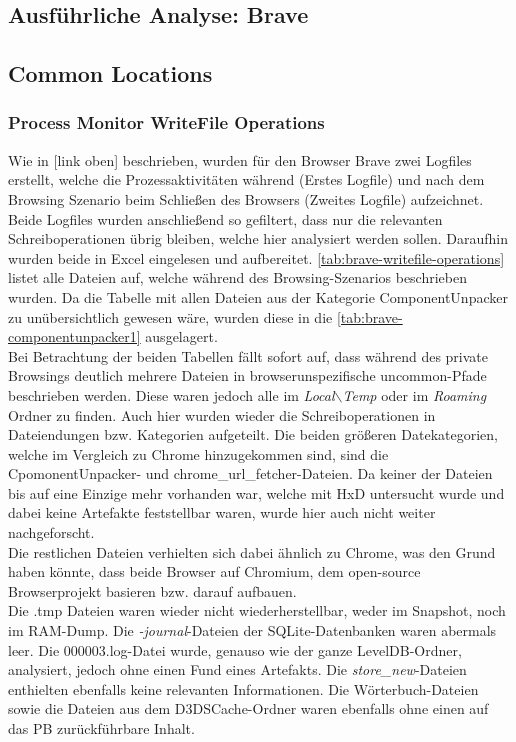 \begin{appendices}

\section{Ausführliche Analyse: Brave}
\subsection{Common Locations}
\label{subsection:appendix-brave-common-locations}
\subsubsection*{Process Monitor WriteFile Operations}
\label{subsubsection:appendix-brave-common-locations-writefile-operations}

Wie in [link oben] beschrieben, wurden für den Browser Brave zwei Logfiles erstellt, welche die Prozessaktivitäten während (Erstes Logfile) und nach dem Browsing Szenario beim Schließen des Browsers (Zweites Logfile) aufzeichnet. Beide Logfiles wurden anschließend so gefiltert, dass nur die relevanten Schreiboperationen übrig bleiben, welche hier analysiert werden sollen. Daraufhin wurden beide in Excel eingelesen und aufbereitet. \autoref{tab:brave-writefile-operations} listet alle Dateien auf, welche während des Browsing-Szenarios beschrieben wurden. Da die Tabelle mit allen Dateien aus der Kategorie \glqq{}ComponentUnpacker\grqq{} zu unübersichtlich gewesen wäre, wurden diese in die \autoref{tab:brave-componentunpacker1} ausgelagert.\\
Bei Betrachtung der beiden Tabellen fällt sofort auf, dass während des private Browsings deutlich mehrere Dateien in browserunspezifische \glqq{}uncommon\grqq{}-Pfade beschrieben werden. Diese waren jedoch alle im \textit{Local$\backslash$Temp} oder im \textit{Roaming} Ordner zu finden. Auch hier wurden wieder die Schreiboperationen in Dateiendungen bzw. Kategorien aufgeteilt. Die beiden größeren Datekategorien, welche im Vergleich zu Chrome hinzugekommen sind, sind die \glqq{}CpomonentUnpacker\grqq{}- und \glqq{}chrome\_url\_fetcher\grqq{}-Dateien. Da keiner der Dateien bis auf eine Einzige mehr vorhanden war, welche mit HxD untersucht wurde und dabei keine Artefakte feststellbar waren, wurde hier auch nicht weiter nachgeforscht. \\
Die restlichen Dateien verhielten sich dabei ähnlich zu Chrome, was den Grund haben könnte, dass beide Browser auf Chromium, dem open-source Browserprojekt basieren bzw. darauf aufbauen. \\
Die .tmp Dateien waren wieder nicht wiederherstellbar, weder im Snapshot, noch im RAM-Dump. Die \textit{-journal}-Dateien der SQLite-Datenbanken waren abermals leer. Die 000003.log-Datei wurde, genauso wie der ganze LevelDB-Ordner, analysiert, jedoch ohne einen Fund eines Artefakts. Die \textit{store\_new}-Dateien enthielten ebenfalls keine relevanten Informationen. Die Wörterbuch-Dateien sowie die Dateien aus dem \glqq{}D3DSCache\grqq{}-Ordner waren ebenfalls ohne einen auf das PB zurückführbare Inhalt.


\end{appendices}
